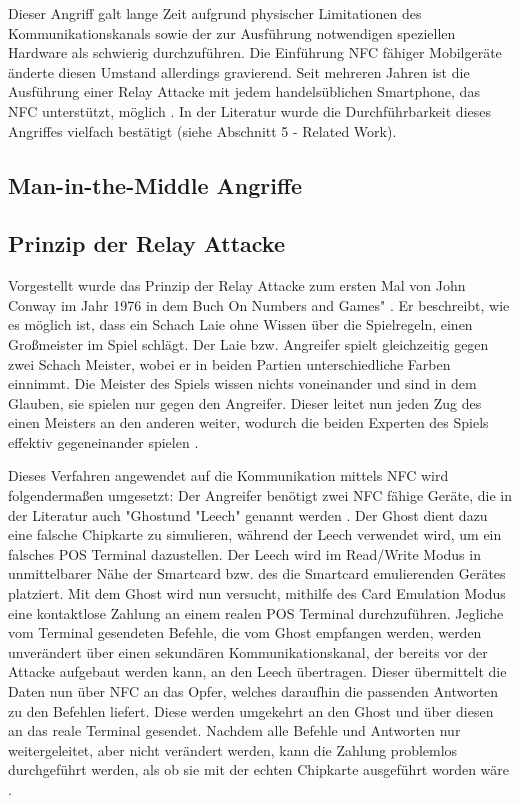 Dieser Angriff galt lange Zeit aufgrund physischer Limitationen des Kommunikationskanals sowie der zur Ausführung notwendigen speziellen Hardware als schwierig durchzuführen. Die Einführung NFC fähiger Mobilgeräte änderte diesen Umstand allerdings gravierend. Seit mehreren Jahren ist die Ausführung einer Relay Attacke mit jedem handelsüblichen Smartphone, das NFC unterstützt, möglich \cite{practicalExperiencesNfcRelayAndroid}.  In der Literatur wurde die Durchführbarkeit dieses Angriffes vielfach bestätigt (siehe Abschnitt 5 - Related Work). 

\subsection{Man-in-the-Middle Angriffe}

\subsection{Prinzip der Relay Attacke}

Vorgestellt wurde das Prinzip der Relay Attacke zum ersten Mal von John Conway im Jahr 1976 in dem Buch \glqq On Numbers and Games" \textbf{\cite{Buchzitat}}. Er beschreibt, wie es möglich ist, dass ein Schach Laie ohne Wissen über die Spielregeln, einen Großmeister im Spiel schlägt. Der Laie bzw. Angreifer spielt gleichzeitig gegen zwei Schach Meister, wobei er in beiden Partien unterschiedliche Farben einnimmt. Die Meister des Spiels wissen nichts voneinander und sind in dem Glauben, sie spielen nur gegen den Angreifer. Dieser leitet nun jeden Zug des einen Meisters an den anderen weiter, wodurch die beiden Experten des Spiels effektiv gegeneinander spielen \textbf{\cite{Buchzitat}}. 

Dieses Verfahren angewendet auf die Kommunikation mittels NFC wird folgendermaßen umgesetzt: Der Angreifer benötigt zwei NFC fähige Geräte, die in der Literatur auch "Ghost\grqq und "Leech" genannt werden \cite{pickingVirtualPockets}. Der Ghost dient dazu eine falsche Chipkarte zu simulieren, während der Leech verwendet wird, um ein falsches POS Terminal dazustellen. Der Leech wird im Read/Write Modus in unmittelbarer Nähe der Smartcard bzw. des die Smartcard emulierenden Gerätes platziert. Mit dem Ghost wird nun versucht, mithilfe des Card Emulation Modus eine kontaktlose Zahlung an einem realen POS Terminal durchzuführen. Jegliche vom Terminal gesendeten Befehle, die vom Ghost empfangen werden, werden unverändert über einen sekundären Kommunikationskanal, der bereits vor der Attacke aufgebaut werden kann, an den Leech übertragen. Dieser übermittelt die Daten nun über NFC an das Opfer, welches daraufhin die passenden Antworten zu den Befehlen liefert. Diese werden umgekehrt an den Ghost und über diesen an das reale Terminal gesendet. Nachdem alle Befehle und Antworten nur weitergeleitet, aber nicht verändert werden, kann die Zahlung problemlos durchgeführt werden, als ob sie mit der echten Chipkarte ausgeführt worden wäre \cite{pickingVirtualPockets}.

